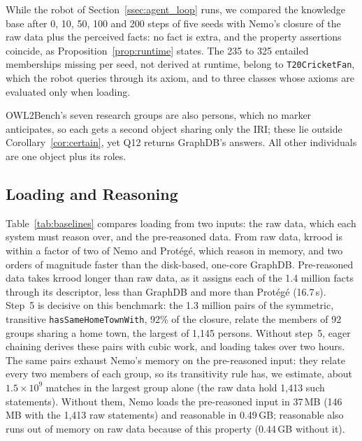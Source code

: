 \documentclass[sigconf,anonymous]{aamas}
\begin{document}
While the robot of Section~\ref{ssec:agent_loop} runs, we compared the knowledge base after 0, 10, 50, 100 and 200 steps of five seeds with Nemo's closure of the raw data plus the perceived facts: no fact is extra, and the property assertions coincide, as Proposition~\ref{prop:runtime} states. The 235 to 325 entailed memberships missing per seed, not derived at runtime, belong to \texttt{T20CricketFan}, which the robot queries through its axiom, and to three classes whose axioms are evaluated only when loading.

OWL2Bench's seven research groups are also persons, which no marker anticipates, so each gets a second object sharing only the IRI; these lie outside Corollary~\ref{cor:certain}, yet Q12 returns GraphDB's answers. All other individuals are one object plus its roles.

\subsection{Loading and Reasoning}
\label{ssec:loading}

Table~\ref{tab:baselines} compares loading from two inputs: the raw data, which each system must reason over, and the pre-reasoned data. From raw data, \ac{krrood} is within a factor of two of Nemo and Protégé, which reason in memory, and two orders of magnitude faster than the disk-based, one-core GraphDB. Pre-reasoned data takes \ac{krrood} longer than raw data, as it assigns each of the 1.4 million facts through its descriptor, less than GraphDB and more than Protégé (16.7\,s). Step~5 is decisive on this benchmark: the 1.3 million pairs of the symmetric, transitive \texttt{hasSameHomeTownWith}, 92\% of the closure, relate the members of 92 groups sharing a home town, the largest of 1,145 persons. Without step~5, eager chaining derives these pairs with cubic work, and loading takes over two hours. The same pairs exhaust Nemo's memory on the pre-reasoned input: they relate every two members of each group, so its transitivity rule has, we estimate, about $1.5\times10^{9}$ matches in the largest group alone (the raw data hold 1,413 such statements). Without them, Nemo loads the pre-reasoned input in 37\,MB (146\,MB with the 1,413 raw statements) and reasonable in 0.49\,GB; reasonable also runs out of memory on raw data because of this property (0.44\,GB without it).

\begin{table}[t]
  \centering
  \caption{Loading time (s; mean $\pm$ s.d.\ of 5 runs, or one run) and memory increase ($^{\ast}$Java heap in use) from raw (54,901 statements) and pre-reasoned data (1,431,635); lowest in bold. ``Out of memory'': stopped at 24\,GB. ``Persists'': data stored outside working memory; ``+ ORMatic'': also stored in PostgreSQL (server memory excluded). $^{\dagger}$22\,GB heap; Pellet fails with the default 2\,GB.}
  \label{tab:baselines}
  \footnotesize
  \setlength{\tabcolsep}{2.4pt}
  
\end{table}
\end{document}
